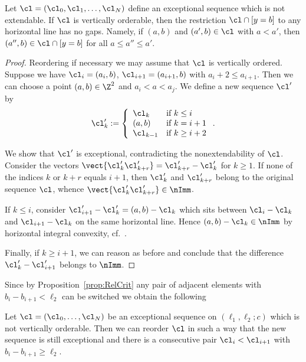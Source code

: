 \begin{coro}
\label{coro:NoGaps}
Let $\cl=(\cl_0,\cl_1,\ldots,\cl_N)$ define an
exceptional sequence which is not extendable. 
If $\cl$ is vertically orderable, 
then the restriction $\cl\cap[y=b]$ to any horizontal 
line has no gaps. Namely, if $(a,b)$ and $(a',b)\in\cl$ 
with $a<a'$, then $(a'',b)\in\cl\cap[y=b]$ for all 
$a\leq a''\leq a'$.
\end{coro}

\begin{proof}
Reordering if necessary we may assume 
that $\cl$ is vertically ordered. 
Suppose we have $\cl_i=(a_i,b)$, 
$\cl_{i+1}=(a_{i+1},b)$ with $a_i+2\leq a_{i+1}$. 
Then we can choose a point $(a,b)\in\Z^2$ and $a_i<a<a_j$.
We define a new sequence $\cl'$ by
$$
\cl'_k:=\left\{\begin{array}{ll}
\cl_k & \mbox{if }k\leq i\\
(a,b) & \mbox{if }k=i+1\\
\cl_{k-1} & \mbox{if }k\geq i+2
\end{array}\right..
$$

We show that $\cl'$ is exceptional, contradicting the 
nonextendability of $\cl$. Consider the vectors 
$\vect{\cl'_k\cl'_{k+r}}=\cl'_{k+r}-\cl'_k$ 
for $k\geq 1$. If none of the indices $k$ or $k+r$ 
equals $i+1$, then $\cl'_k$ and $\cl'_{k+r}$ belong to 
the original sequence $\cl$, whence 
$\vect{\cl'_k\cl'_{k+r}}\in\nImm$.

If $k\leq i$, consider $\cl'_{i+1}-\cl'_k=(a,b)-\cl_k$ 
which sits between $\cl_i-\cl_k$ and $\cl_{i+1}-\cl_k$ 
on the same horizontal line. Hence $(a,b)-\cl_k\in\nImm$ 
by horizontal integral convexity, cf.\ 
.

Finally, if $k\geq i+1$, we can reason as before
and conclude that the difference $\cl'_k-\cl'_{i+1}$ 
belongs to $\nImm$.  
\end{proof}

{Since by Proposition~\ref{prop:RelCrit} any 
pair of adjacent elements with $b_i-b_{i+1}<\ell_2$ can be switched we 
obtain the following}

\begin{lemma}
\label{lem:ReorderJump}
Let $\cl=(\cl_0,\ldots,\cl_N)$ be an 
exceptional sequence on $(\ell_1,\ell_2;c)$ 
which is not vertically orderable. Then we can 
reorder $\cl$ in such a way that the new 
sequence is still exceptional and there is a 
consecutive pair $\cl_i<\cl_{i+1}$ with 
$b_i-b_{i+1}\geq\ell_2$. 
\end{lemma}

